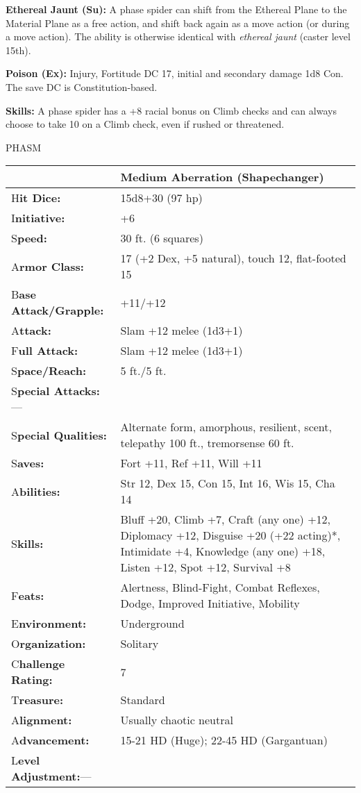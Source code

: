 \documentclass{article}
\begin{document}
\textbf{Ethereal Jaunt (Su): }A phase spider can shift from the Ethereal Plane 
to the Material Plane as a free action, and shift back again as a move action (or 
during a move action). The ability is otherwise identical with \textit{ethereal 
jaunt }(caster level 15th). 

\textbf{Poison (Ex): }Injury, Fortitude DC 17, initial and secondary damage 1d8 
Con. The save DC is Constitution-based.

\textbf{Skills:} A phase spider has a +8 racial bonus on Climb checks and can always 
choose to take 10 on a Climb check, even if rushed or threatened.

\vspace{12pt}
{\LARGE{}PHASM}

\begin{tabular}{|>{\raggedright}p{91pt}|>{\raggedright}p{196pt}|}
\hline
  & Medium Aberration (Shapechanger)\tabularnewline
\hline
H\textbf{it Dice:} & 15d8+30 (97 hp)\tabularnewline
\hline
I\textbf{nitiative:} & +6\tabularnewline
\hline
S\textbf{peed:} & 30 ft. (6 squares)\tabularnewline
\hline
A\textbf{rmor Class:} & 17 (+2 Dex, +5 natural), touch 12, flat-footed 15\tabularnewline
\hline
B\textbf{ase Attack/Grapple:} & +11/+12\tabularnewline
\hline
A\textbf{ttack:} & Slam +12 melee (1d3+1)\tabularnewline
\hline
F\textbf{ull Attack:} & Slam +12 melee (1d3+1)\tabularnewline
\hline
S\textbf{pace/Reach:} & 5 ft./5 ft.\tabularnewline
\hline
S\textbf{pecial Attacks:}--- & \tabularnewline
\hline
S\textbf{pecial Qualities:} & Alternate form, amorphous, resilient, scent, telepathy 
100 ft., tremorsense 60 ft.\tabularnewline
\hline
S\textbf{aves:} & Fort +11, Ref +11, Will +11\tabularnewline
\hline
A\textbf{bilities:} & Str 12, Dex 15, Con 15, Int 16, Wis 15, Cha 14\tabularnewline
\hline
S\textbf{kills:} & Bluff +20, Climb +7, Craft (any one) +12, Diplomacy +12, Disguise 
+20 (+22 acting)*, Intimidate +4, Knowledge (any one) +18, Listen +12, Spot +12, 
Survival +8\tabularnewline
\hline
F\textbf{eats:} & Alertness, Blind-Fight, Combat Reflexes, Dodge, Improved Initiative, 
Mobility\tabularnewline
\hline
E\textbf{nvironment:} & Underground\tabularnewline
\hline
O\textbf{rganization:} & Solitary\tabularnewline
\hline
C\textbf{hallenge Rating:} & 7\tabularnewline
\hline
T\textbf{reasure:} & Standard\tabularnewline
\hline
A\textbf{lignment:} & Usually chaotic neutral\tabularnewline
\hline
A\textbf{dvancement:} & 15-21 HD (Huge); 22-45 HD (Gargantuan)\tabularnewline
\hline
L\textbf{evel Adjustment:}--- & \tabularnewline
\hline
\end{tabular}
\end{document}
